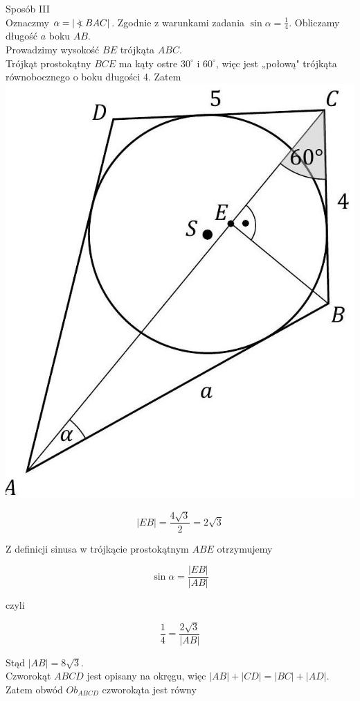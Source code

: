 \documentclass[10pt]{article}
\newcommand\Varangle{\mathop{{<\!\!\!\!\!\text{\small)}}\:}\nolimits}
\begin{document}
Sposób III\\
Oznaczmy $\alpha=|\Varangle B A C|$. Zgodnie z warunkami zadania $\sin \alpha=\frac{1}{4}$. Obliczamy długość $a$ boku $A B$.\\
Prowadzimy wysokość $B E$ trójkąta $A B C$.\\
Trójkąt prostokątny $B C E$ ma kąty ostre $30^{\circ}$ i $60^{\circ}$, więc jest „połową" trójkąta równobocznego o boku długości 4. Zatem\\
\includegraphics[max width=\textwidth, center]{2025_02_07_dcb3d059df06a3930b0ag-30(1)}

$$
|E B|=\frac{4 \sqrt{3}}{2}=2 \sqrt{3}
$$

Z definicji sinusa w trójkącie prostokątnym $A B E$ otrzymujemy

$$
\sin \alpha=\frac{|E B|}{|A B|}
$$

czyli

$$
\frac{1}{4}=\frac{2 \sqrt{3}}{|A B|}
$$

Stąd $|A B|=8 \sqrt{3}$.\\
Czworokąt $A B C D$ jest opisany na okręgu, więc $|A B|+|C D|=|B C|+|A D|$.\\
Zatem obwód $O b_{A B C D}$ czworokąta jest równy
\end{document}
